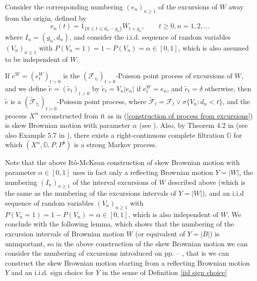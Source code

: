 \documentclass[reqno]{amsart}
\theoremstyle{definition}
\theoremstyle{remark}
\numberwithin{equation}{section}
\begin{document}
Consider the corresponding numbering $(e_{n})_{n\ge 1}$ of the excursions of $W$ away from the origin, defined by
\begin{equation}
e_{n}(t)=1_{\{0\le t \le d_n-g_n\}} W_{t+g_{n}}, \qquad t\ge 0, n=1,2,\ldots
\end{equation}
where $I_{n}=(g_{n},d_{n})$, and consider the i.i.d. sequence of random variables $(V_{n})_{n\ge 1}$ with $P(V_{n}=1)=1-P(V_{n})=\alpha\in[0,1]$, which is also assumed to be independent of $W$.

If $e^W=(e^W_t)_{t>0}$ is the $(\mathcal{F}_{\tau_t})_{t>0}$-Poisson point process of excursions of $W$, and we define $\tilde{e}=(\tilde{e}_t)_{t>0}$ by $\tilde{e}_t=V_{n}\vert e_n\vert$ if $e_t^W=e_{n}$, and $\tilde{e}_t=\delta$ otherwise, then $\tilde{e}$ is a $(\tilde{\mathcal{F}}_{ \tau_t})_{t>0}$-Poisson point process, where $\tilde{\mathcal{F}}_t=\mathcal{F}_t \vee \sigma\{V_{n} : d_n<t \}$, and the process $X^\alpha$ reconstructed  from it as in (\ref{construction of process from excursions}) is skew Brownian motion with parameter $\alpha$ (see \cite{Ito-McKean}). Also, by Theorem 4.2 in \cite{Salisbury1} (see also Example 5.7 in \cite{Salisbury2}), there exists a right-continuous complete filtration $\mathbb G$ for which $(X^\alpha,\mathbb G, P, P^b)$ is a strong Markov process.

Note that the above It\^{o}-McKean construction of skew Brownian motion with parameter $\alpha\in[0,1]$ uses in fact only a reflecting Brownian motion $Y=\vert W\vert$, the numbering $(I_n)_{n\ge 1}$ of the interval excursions of $W$ described above (which is the same as the numbering of the excursions intervals of $Y=\vert W\vert$), and an i.i.d sequence of random variables $(V_n)_{n\ge 1}$ with  $P(V_{n}=1)=1-P(V_{n})=\alpha\in[0,1]$, which is also independent of $W$. We conclude with the following lemma, which shows that the numbering of the excursion intervals of Brownian motion $W$ (or equivalent of $Y=\vert B\vert$) is unimportant, so in the above construction of the skew Brownian motion we can consider the numbering of excursions introduced on pp. \pageref{sign choice} -- \pageref{iid sign choice}, that is we can construct the skew Brownian motion starting from a reflecting Brownian motion $Y$ and an i.i.d. sign choice for $Y$ in the sense of Definition \ref{iid sign choice}
\end{document}

